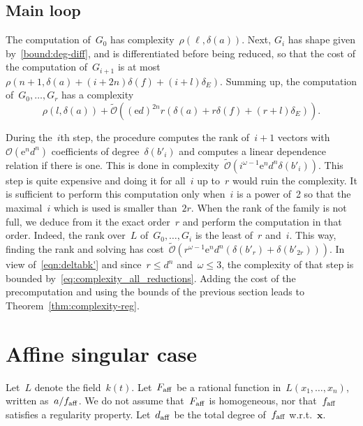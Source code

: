 \documentclass{sig-alternate}
\newcommand{\softO}{\tilde{\mathcal{O}}}
\newcommand{\bigO}{{\mathcal{O}}}
\newcommand{\xx}{\mathbf{x}}
\newcommand{\aff}{{\smash{\mathrm{aff}}}}
\newcommand{\eexp}{\mathrm{e}}
\begin{document}
\subsection{Main loop}

\noindent The computation of~$G_0$ has complexity~$\rho(\ell, \delta(a))$.
Next, $G_i$ has shape given by~\eqref{bound:deg-diff}, and is differentiated before being reduced, so that the cost of 
the computation of~$G_{i+1}$ is at most~$\rho(n+1, \delta(a)+(i+2n)\delta(f)+(i+l)\delta_E)$.
Summing up, the computation of~$G_0,\dotsc,G_r$ has a complexity
\begin{equation}\label{eq:complexity_all_reductions}
 \rho(l,\delta(a))+ \softO\left( (\eexp d)^{2n}r \left (\delta(a)+r\delta(f)+(r+l)\delta_E \right)  \right). \end{equation}

During the~$i$th step, the procedure computes the rank of~$i+1$ vectors with~$\bigO(\eexp^n d^n)$ coefficients of degree~$\delta(b'_i)$ and computes a linear dependence relation if there is one.
This is done in complexity~$\softO\left( i^{\omega-1}\eexp^nd^n \delta(b'_i) \right)$.
This step is quite expensive and doing it for all~$i$ up to~$r$ would ruin the complexity.
It is sufficient to perform this computation only when~$i$ is a  power of~2 so that the maximal~$i$ which is used is smaller than~$2r$.
When the rank of the family is not full, we deduce from it the exact order~$r$ and perform the computation in that order.
Indeed, the rank over~$L$ of~$G_0,\dotsc,G_i$ is the least of~$r$ and~$i$.
This way, finding the rank and solving has cost~$\softO(r^{\omega-1}\eexp^nd^n(\delta(b'_r)+\delta(b'_{2r})))$. In view of~\eqref{eqn:deltabk'} and since~$r\leqslant d^n$ and~$\omega\leqslant 3$, the complexity of that step is bounded by~\eqref{eq:complexity_all_reductions}.
Adding the cost of the precomputation and using the bounds of the previous section leads to Theorem~\ref{thm:complexity-reg}.

\section{Affine singular case}
\label{sec:singular}


\noindent Let~$L$ denote the field~$k(t)$.
Let~$F_\aff$ be a rational function in~$L(x_1,\dotsc,x_n)$, written as~$a/f_\aff$.
We do not assume that~$F_\aff$ is homogeneous, nor that~$f_\aff$ satisfies a regularity property.
Let~$d_\aff$ be the total degree of~$f_\aff$ w.r.t.~$\xx$.
\end{document}
